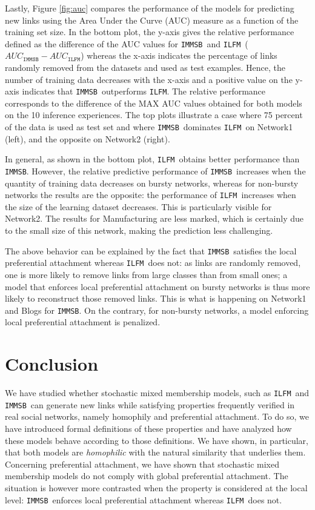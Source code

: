 \documentclass[french]{hermes-journal}
\newcommand{\ilfm}{\texttt{ILFM}}
\newcommand{\immsb}{\texttt{IMMSB}}
\begin{document}
Lastly, Figure \ref{fig:auc} compares the performance of the models for predicting new links using the Area Under the Curve (AUC) measure as a function of the training set size. In the bottom plot, the y-axis gives the relative performance defined as the difference of the AUC values for \immsb\ and \ilfm\ ($AUC_{\immsb} - AUC_{\ilfm}$) whereas the x-axis indicates the percentage of links randomly removed from the datasets and used as test examples. Hence, the number of training data decreases with the x-axis and a positive value on the y-axis indicates that \immsb\ outperforms \ilfm.  The relative performance corresponds to the difference of the MAX AUC values obtained for both models on the 10 inference experiences. The top plots illustrate a case where 75 percent of the data is used as test set and where \immsb\ dominates \ilfm\ on Network1 (left), and the opposite on Network2 (right).

In general, as shown in the bottom plot, \ilfm\ obtains better performance than \immsb. However, the relative predictive performance of \immsb\  increases  when the quantity of training data decreases on bursty networks, whereas for non-bursty networks the results are the opposite: the performance of \ilfm\ increases when the size of the learning dataset decreases. This is particularly visible for Network2. The results for Manufacturing are less marked, which is certainly due to the small size of this network, making the prediction less challenging.

The above behavior can be explained by the fact that \immsb\ satisfies the local preferential attachment whereas \ilfm\ does not: as links are randomly removed, one is more likely to remove links from large classes than from small ones; a model that enforces local preferential attachment on bursty networks is thus more likely to reconstruct those removed links. This is what is happening on Network1 and Blogs for \immsb. On the contrary, for non-bursty networks, a model enforcing local preferential attachment is penalized.

\section{Conclusion}

We have studied whether stochastic mixed membership models, such as \ilfm\ and \immsb\, can generate new links while satisfying properties frequently verified in real  social networks, namely homophily and preferential attachment. To do so, we have introduced formal definitions of these properties and have analyzed how these models behave according to those definitions. We have shown, in particular, that both models are \textit{homophilic} with the natural similarity that underlies them. Concerning preferential attachment, we have shown that stochastic mixed membership models do not comply with global preferential attachment. The situation is however more contrasted when the property is considered at the local level: \immsb\ enforces local preferential attachment whereas \ilfm\ does not.
\end{document}
